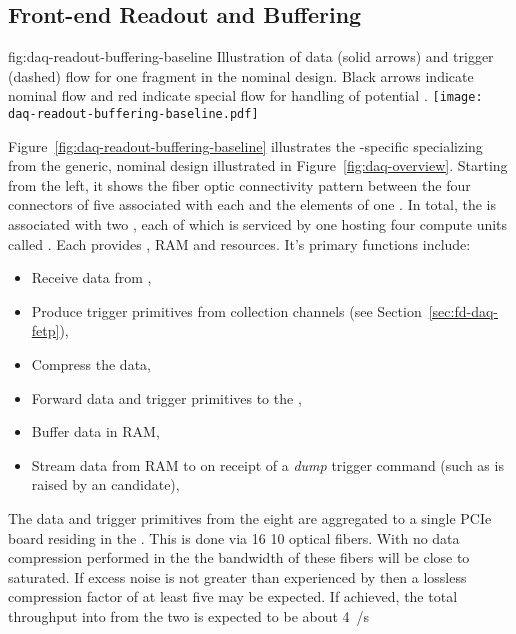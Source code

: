 

\subsection{Front-end Readout and Buffering}
\label{sec:fd-daq-fero}


\begin{dunefigure}{fig:daq-readout-buffering-baseline}
  {Illustration of data (solid arrows) and trigger (dashed) flow for
    one \single {} fragment in the nominal design. 
    Black arrows indicate nominal flow and red indicate special flow
    for handling of potential .  } %
  \texttt{[image: daq-readout-buffering-baseline.pdf]}%
\end{dunefigure}


Figure~\ref{fig:daq-readout-buffering-baseline} illustrates the
-specific  specializing from the generic,
nominal design illustrated in Figure~\ref{fig:daq-overview}.  
Starting from the left, it shows the fiber optic connectivity pattern
between the four connectors of five   associated
with each  and the elements of one  . 
In total, the  is associated with two , each of which
is serviced by one   hosting four compute
units called . 
Each  provides , RAM and  resources.
It's primary functions include:
\begin{itemize}
\item Receive data from ,
\item Produce trigger primitives from collection channels (see Section~\ref{sec:fd-daq-fetp}),
\item Compress the data,
\item Forward data and trigger primitives to the ,
\item Buffer data in RAM, 
\item Stream data from RAM to  on receipt of a \textit{dump}
  trigger command (such as is raised by an  candidate),
\end{itemize}

The data and trigger primitives from the eight  are
aggregated to a single  PCIe board residing in the
. 
This is done via \num{16} \SI{10}{\Gbps} optical fibers. 
With no data compression performed in the  the bandwidth
of these fibers will be close to saturated. 
If excess noise is not greater than experienced by \microboone then a
lossless compression factor of at least five may be expected.
If achieved, the total throughput into  from the two 
is expected to be about \SI{4}{\GB/s}

